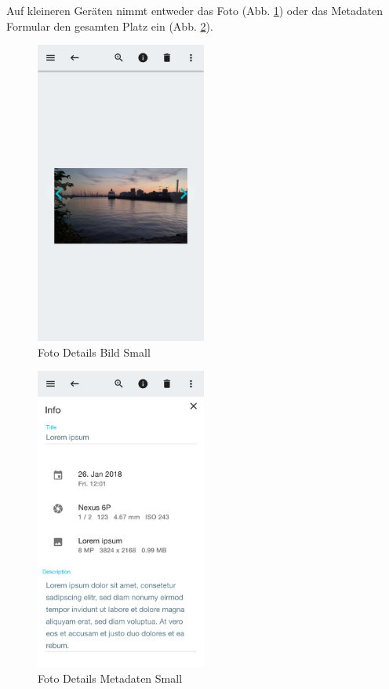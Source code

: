 Auf kleineren Geräten nimmt entweder das Foto (Abb. \ref{fig:details_small}) oder das Metadaten Formular den gesamten Platz ein (Abb. \ref{fig:form_small}). 

\begin{figure}[htp]     %
\centering
\includegraphics[width=0.5\textwidth]{images/details_small} 
\caption{Foto Details Bild Small}\label{fig:details_small}
\end{figure}

\begin{figure}[htp]     %
\centering
\includegraphics[width=0.5\textwidth]{images/form_small} 
\caption{Foto Details Metadaten Small}\label{fig:form_small}
\end{figure}

